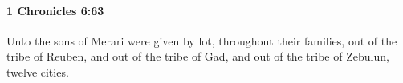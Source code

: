 
		\paragraph{1 Chronicles 6:63} %
			\label{1CHRONICLES-6-63}

			Unto the sons of Merari were given by lot, throughout their families, out of the tribe of Reuben, and out of the tribe of Gad, and out of the tribe of Zebulun, twelve cities.


